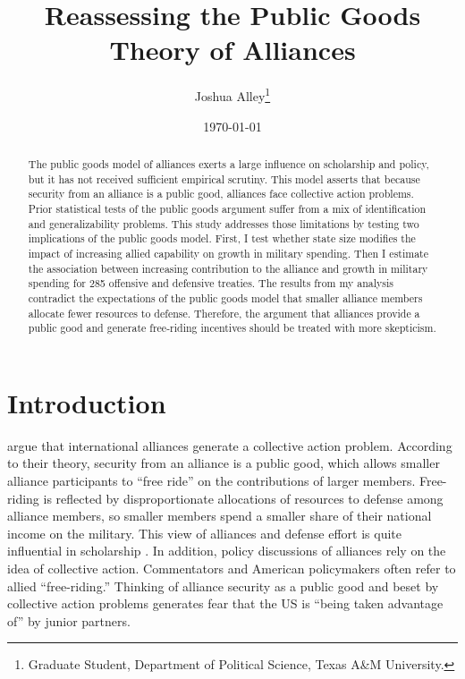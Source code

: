 \documentclass[12pt]{article}
\title{
\textbf{Reassessing the Public Goods Theory of Alliances}
	}
\author{Joshua Alley\footnote{Graduate Student,
Department of Political Science, Texas A\&M University.}}
\date{{\normalsize \today}}
\begin{document}
\maketitle 

\doublespace

\begin{abstract}
The public goods model of alliances exerts a large influence on scholarship and policy, but it has not received sufficient empirical scrutiny. 
This model asserts that because security from an alliance is a public good, alliances face collective action problems. 
Prior statistical tests of the public goods argument suffer from a mix of identification and generalizability problems. 
This study addresses those limitations by testing two implications of the public goods model. 
First, I test whether state size modifies the impact of increasing allied capability on growth in military spending. 
Then I estimate the association between increasing contribution to the alliance and growth in military spending for 285 offensive and defensive treaties. 
The results from my analysis contradict the expectations of the public goods model that smaller alliance members allocate fewer resources to defense. 
Therefore, the argument that alliances provide a public good and generate free-riding incentives should be treated with more skepticism. 

\end{abstract} 



\section{Introduction}



\citet{OlsonZeckhauser1966} argue that international alliances generate a collective action problem. 
According to their theory, security from an alliance is a public good, which allows smaller alliance participants to ``free ride'' on the contributions of larger members. 
Free-riding is reflected by disproportionate allocations of resources to defense among alliance members, so smaller members spend a smaller share of their national income on the military.
This view of alliances and defense effort is quite influential in scholarship \citep{Walt1990, Mearsheimer1994, SandlerHartley2001, Garfinkel2004, Walt2009, Barrett2010}. 
In addition, policy discussions of alliances rely on the idea of collective action.
Commentators and American policymakers often refer to allied ``free-riding.'' 
Thinking of alliance security as a public good and beset by collective action problems generates fear that the US is ``being taken advantage of'' by junior partners. 
\end{document}
